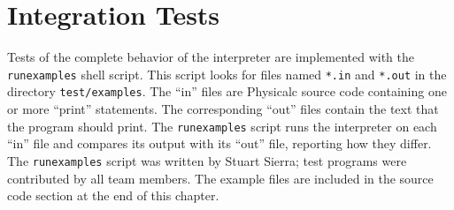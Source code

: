 \section{Integration Tests}

Tests of the complete behavior of the interpreter are implemented with
the \texttt{runexamples} shell script.  This script looks for files
named \texttt{*.in} and \texttt{*.out} in the directory
\texttt{test/examples}.  The ``in'' files are Physicalc source code
containing one or more ``print'' statements.  The corresponding
``out'' files contain the text that the program should print.  The
\texttt{runexamples} script runs the interpreter on each ``in'' file
and compares its output with its ``out'' file, reporting how they
differ.  The \texttt{runexamples} script was written by Stuart Sierra;
test programs were contributed by all team members.  The example files
are included in the source code section at the end of this chapter.
